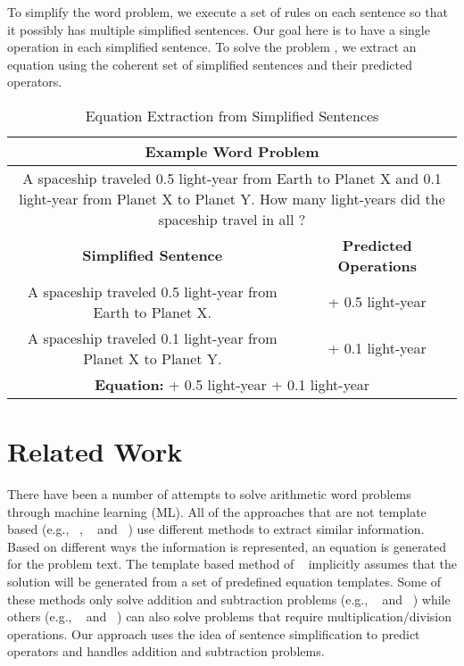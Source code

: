 \documentclass[11pt]{article}
\begin{document}
To simplify the word problem, we execute a set of rules on each sentence so that it possibly has multiple simplified sentences. Our goal here is to have a single operation in each simplified sentence. To solve the problem , we extract an equation using the coherent set of simplified sentences and their predicted operators.
\begin{table}[h]
\begin{tabularx}{7.9cm}{|c|c|}
\hline 
\multicolumn{2}{|c|}{\bf{Example Word Problem}} \\ \hline
\multicolumn{2}{|p{7cm}|}{A spaceship traveled 0.5 light-year from Earth to Planet X and 0.1 light-year from Planet X to Planet Y. How many light-years did the spaceship travel in all ?} \\ \hline
\multicolumn{1}{|m{5cm}|}{\bf \centering Simplified Sentence} & \multicolumn{1}{m{2cm}|}{\bf \centering Predicted Operations} \\ \hline
\multicolumn{1}{|m{5cm}|}{A spaceship traveled 0.5 light-year from Earth to Planet X.} & \multicolumn{1}{m{2cm}|}{\centering + 0.5 light-year} \\ \hline
\multicolumn{1}{|m{5cm}|}{A spaceship traveled 0.1 light-year from Planet X to Planet Y.} & \multicolumn{1}{m{2cm}|}{\centering + 0.1 light-year} \\ \hline
\multicolumn{2}{|m{7cm}|}{\centering \textbf{Equation:}  + 0.5 light-year + 0.1 light-year} \\ \hline
\end{tabularx}
\caption{\label{figure:1} Equation Extraction from Simplified Sentences }
\end{table}

\section{Related Work}
There have been a number of attempts to solve arithmetic word problems through machine learning (ML). All of the approaches that are not template based (e.g., ~\cite{ARIS:14}, ~\cite{RoyT:15} and ~\cite{RoyR:15}) use different methods to extract similar information. Based on different ways the information is represented, an equation is generated for the problem text. The template based method of ~\cite{Kushman:14} implicitly assumes that the solution will be generated from a set of predefined equation templates. Some of these methods only solve addition and subtraction problems (e.g., ~\cite{ARIS:14} and ~\cite{RoyT:15}) while others (e.g., ~\cite{RoyR:15} and ~\cite{Kushman:14}) can also solve problems that require multiplication/division operations. Our approach uses the idea of sentence simplification to predict operators and handles addition and subtraction problems.
\end{document}
